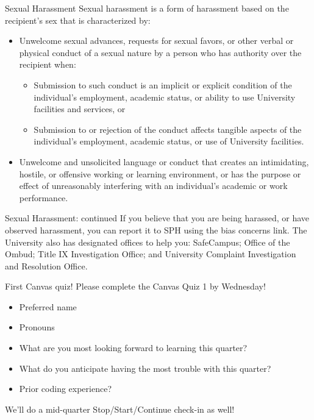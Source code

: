 \documentclass[10pt,t]{beamer}
\begin{document}
\begin{frame}{Sexual Harassment}
Sexual harassment is a form of harassment based on the recipient’s sex that is characterized by:
\begin{itemize}
	\item Unwelcome sexual advances, requests for sexual favors, or other verbal or physical conduct of a sexual nature by a person who has authority over the recipient when:
	\begin{itemize}
		\item Submission to such conduct is an implicit or explicit condition of the individual’s employment, academic status, or ability to use University facilities and services, or
		\item Submission to or rejection of the conduct affects tangible aspects of the individual’s employment, academic status, or use of University facilities.
	\end{itemize}
\item Unwelcome and unsolicited language or conduct that creates an intimidating, hostile, or offensive working or learning environment, or has the purpose or effect of unreasonably interfering with an individual’s academic or work performance.
\end{itemize}
\end{frame}

\begin{frame}{Sexual Harassment: continued}
If you believe that you are being harassed, or have observed harassment, you can report it to SPH using the bias concerns link. The University also has designated offices to help you: SafeCampus; Office of the Ombud; Title IX Investigation Office; and University Complaint Investigation and Resolution Office. 
\end{frame}

\begin{frame}{First Canvas quiz!}
Please complete the Canvas Quiz 1 by Wednesday! 

\vspace{0.3cm}

\begin{itemize}
	\item Preferred name
	\item Pronouns
	\item What are you most looking forward to learning this quarter?
	\item What do you anticipate having the most trouble with this quarter?
	\item Prior coding experience?
\end{itemize}

\vspace{0.3cm}

\color{blue} We'll do a mid-quarter Stop/Start/Continue check-in as well!

\end{frame}
\end{document}
